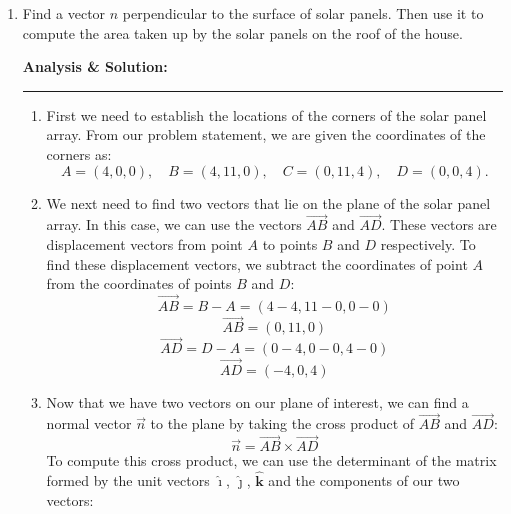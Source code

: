 \documentclass[12pt]{article} %
\numberwithin{equation}{section}
\begin{document}
    \begin{enumerate}[label=\roman*.]
    \item Find a vector \(n\) perpendicular to the surface of solar panels.
            Then use it to compute the area taken up by the solar panels on the roof of the house.\par
            \bigskip
            \hspace{0.5em}
            \textbf{Analysis \& Solution:}
            \begin{center}
            \rule{\linewidth}{1pt}
            \end{center}
            \begin{enumerate}[label=\arabic*.]
                \item First we need to establish the locations of the corners of the solar panel array.
                    From our problem statement, we are given the coordinates of the corners as:
                    \[
                    A = (4, 0, 0), \quad B = (4, 11, 0), \quad C = (0, 11, 4), \quad D = (0, 0, 4).
                    \]
                \item We next need to find two vectors that lie on the plane of the solar panel array.
                    In this case, we can use the vectors \(\overrightarrow{AB}\) and \(\overrightarrow{AD}\).
                    These vectors are displacement vectors from point \(A\) to points \(B\) and \(D\) respectively.
                    To find these displacement vectors, we subtract the coordinates of point \(A\) from the coordinates of points \(B\) and \(D\):
                    \[
                    \overrightarrow{AB} = B - A = (4 - 4, 11 - 0, 0 - 0)
                    \]
                    \[
                    \overrightarrow{AB} = (0, 11, 0)
                    \]
                    \smallskip
                    \[
                    \overrightarrow{AD} = D - A = (0 - 4, 0 - 0, 4 - 0)
                    \]
                    \[
                    \overrightarrow{AD} = (-4, 0, 4)
                    \]
                \item Now that we have two vectors on our plane of interest, we can find a normal vector \(\vec{n}\) to the plane by taking the cross product of \(\overrightarrow{AB}\) and \(\overrightarrow{AD}\):
                    \[
                    \vec{n} = \overrightarrow{AB} \times \overrightarrow{AD}
                    \]
                    To compute this cross product, we can use the determinant of the matrix formed by the unit vectors \(\boldsymbol{\hat{\imath}}\), \(\boldsymbol{\hat{\jmath}}\), \(\boldsymbol{\hat{k}}\) and the components of our two vectors:

\end{enumerate}
\end{enumerate}
\end{document}
